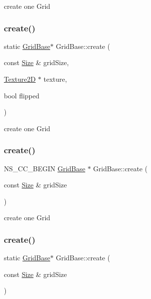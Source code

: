 create one Grid \mbox{\label{classGridBase_a74286efd52e21f45ce6f6d14a966d56c}} 
\subsubsection{\texorpdfstring{create()}{create()}\hspace{0.1cm}{\footnotesize\ttfamily [2/4]}}
{\footnotesize\ttfamily static \hyperlink{classGridBase}{Grid\+Base}$\ast$ Grid\+Base\+::create (\begin{DoxyParamCaption}\item[{const \hyperlink{classSize}{Size} \&}]{grid\+Size,  }\item[{\hyperlink{classTexture2D}{Texture2D} $\ast$}]{texture,  }\item[{bool}]{flipped }\end{DoxyParamCaption})\hspace{0.3cm}{\ttfamily [static]}}

create one Grid \mbox{\label{classGridBase_ad3818fba4dd576b31ff621c3ab48be8a}} 
\subsubsection{\texorpdfstring{create()}{create()}\hspace{0.1cm}{\footnotesize\ttfamily [3/4]}}
{\footnotesize\ttfamily N\+S\+\_\+\+C\+C\+\_\+\+B\+E\+G\+IN \hyperlink{classGridBase}{Grid\+Base} $\ast$ Grid\+Base\+::create (\begin{DoxyParamCaption}\item[{const \hyperlink{classSize}{Size} \&}]{grid\+Size }\end{DoxyParamCaption})\hspace{0.3cm}{\ttfamily [static]}}

create one Grid \mbox{\label{classGridBase_a8a6fa690cb9544da4961653ecf72f1e2}} 
\subsubsection{\texorpdfstring{create()}{create()}\hspace{0.1cm}{\footnotesize\ttfamily [4/4]}}
{\footnotesize\ttfamily static \hyperlink{classGridBase}{Grid\+Base}$\ast$ Grid\+Base\+::create (\begin{DoxyParamCaption}\item[{const \hyperlink{classSize}{Size} \&}]{grid\+Size }\end{DoxyParamCaption})\hspace{0.3cm}{\ttfamily [static]}}

